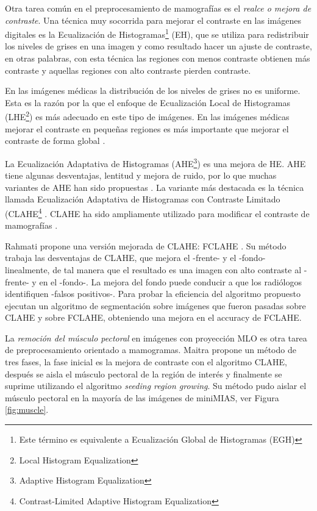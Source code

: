 Otra tarea común en el preprocesamiento de mamografías es el \textit{realce o
mejora de contraste}. Una técnica muy socorrida para mejorar el contraste en
las imágenes digitales es la Ecualización de Histogramas\footnote{Este término es
equivalente a Ecualización Global de Histogramas (EGH)} (EH), que se utiliza
para redistribuir los niveles de grises en una imagen y como resultado hacer un
ajuste de contraste, en otras palabras, con esta técnica las regiones con menos
contraste obtienen más contraste y aquellas regiones con alto contraste pierden
contraste. 

En las imágenes médicas la distribución de los niveles de grises no es
uniforme. Esta es la razón por la que el enfoque de Ecualización Local de
Histogramas (LHE\footnote{Local Histogram Equalization}) es más adecuado en
este tipo de imágenes. En las imágenes médicas mejorar el contraste en
pequeñas regiones es más importante que mejorar el contraste de forma global
\cite{mohan2013modified}. 

La Ecualización Adaptativa de Histogramas (AHE\footnote{Adaptive Histogram
Equalization}) es una mejora de HE. AHE tiene algunas desventajas, lentitud y
mejora de ruido, por lo que muchas variantes de AHE han sido propuestas
\cite{pizer1987adaptive}. La variante más destacada es la técnica llamada
Ecualización Adaptativa de Histogramas con Contraste Limitado
(CLAHE\footnote{Contrast-Limited Adaptive Histogram Equalization}
\cite{pisano1998contrast}. CLAHE ha sido ampliamente utilizado para modificar
el contraste de mamografías \cite{pisano1998contrast, maitra2012technique}.


Rahmati propone una versión mejorada de CLAHE: FCLAHE \cite{rahmati2010new}. Su
método trabaja las desventajas de CLAHE, que mejora el -frente- y el -fondo-
linealmente, de tal manera que el resultado es una imagen con alto contraste al
-frente- y en el -fondo-. La mejora del fondo puede conducir a que los
radiólogos identifiquen -falsos positivos-. Para probar la eficiencia del
algoritmo propuesto ejecutan un algoritmo de segmentación sobre imágenes que
fueron pasadas sobre CLAHE y sobre FCLAHE, obteniendo una mejora en el accuracy
de FCLAHE.

La \textit{remoción del músculo pectoral} en imágenes con proyección MLO es
otra tarea de preprocesamiento orientado a mamogramas. Maitra propone un método
de tres fases, la fase inicial es la mejora de contraste con el algoritmo
CLAHE, después se aisla el músculo pectoral de la región de interés y
finalmente se suprime utilizando el algoritmo \textit{seeding region growing}.
Su método pudo aislar el músculo pectoral en la mayoría de las imágenes de
miniMIAS, ver Figura \ref{fig:muscle}.

